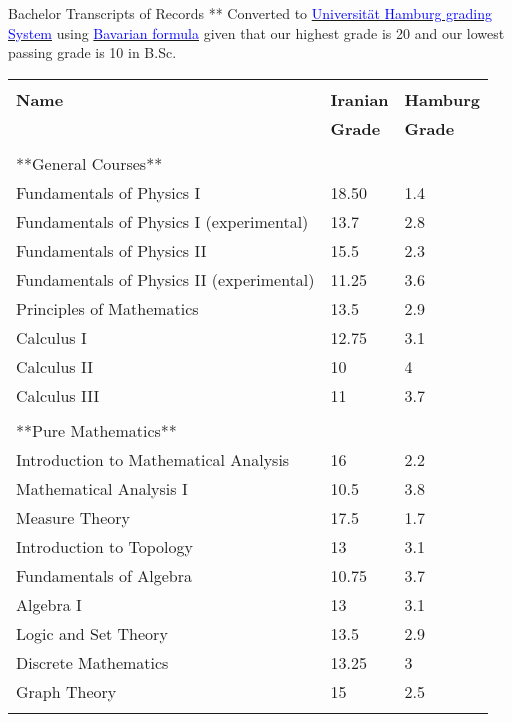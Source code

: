 \documentclass{resume} %
\begin{document}
\begin{cSection}{Bachelor Transcripts of Records}
	** Converted to
	\href{https://apps.unive.it/common2/file/download/destinazioni_erasmus/5a9e7b1fa49c0}{\textcolor{blue}{Universit\"{a}t Hamburg grading System}} using  \href{https://www.uni-hamburg.de/en/campuscenter/bewerbung/international/studium-mit-abschluss/anerkennung-auslaendischer-schulbildung/notenumrechner.html}{\textcolor{blue}{Bavarian formula}} given that our highest grade is 20 and our lowest passing grade is 10 in B.Sc.\\
	\begin{tabular}{ @{} l l l}
		&&\\
	\textbf{Name} & \textbf{Iranian} & \textbf{Hamburg}\\
	& \textbf{Grade} & \textbf{Grade}
	\\\cline{1-3}\\
	**General Courses** &&\\
	‫‪Fundamentals of Physics I & 18.50 & 1.4\\ %
	Fundamentals of Physics I (experimental) & 13.7 & 2.8\\ %
	Fundamentals of Physics II & 15.5 & 2.3 \\ %
	Fundamentals of Physics II (experimental) & 11.25 & 3.6 \\ %
	
	Principles of Mathematics & 13.5 & 2.9\\ %
	
	Calculus I & 12.75 & 3.1 \\ %
	Calculus II & 10 & 4 \\ %
	Calculus III & 11 & 3.7 \\%
	\cline{1-3}\\
	
	**Pure Mathematics**&&\\
	Introduction to Mathematical Analysis & 16 & 2.2 \\ %
	Mathematical Analysis I & 10.5 & 3.8\\ %
	Measure Theory & 17.5 & 1.7 \\ %
	
	Introduction to Topology & 13 & 3.1\\ %
	
	Fundamentals of Algebra & 10.75 & 3.7 \\ %
	Algebra I & 13 & 3.1 \\ %
	Logic and Set Theory  & 13.5 & 2.9\\ %
	Discrete Mathematics & 13.25 & 3\\ %
	Graph Theory & 15 & 2.5 \\ %
	\cline{1-3}\\
	

\end{tabular}
\end{cSection}
\end{document}
